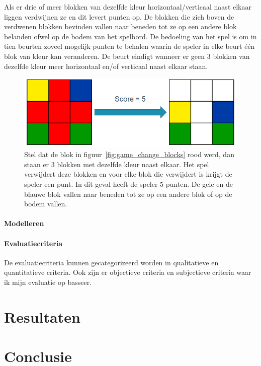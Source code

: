 \documentclass[12pt,a4paper,oneside]{book}
\begin{document}
Als er drie of meer blokken van dezelfde kleur horizontaal/verticaal naast elkaar liggen verdwijnen ze en dit levert punten op. De blokken die zich boven de verdwenen blokken bevinden vallen naar beneden tot ze op een andere blok belanden ofwel op de bodem van het spelbord. De bedoeling van het spel is om in tien beurten zoveel mogelijk punten te behalen waarin de speler in elke beurt \'{e}\'{e}n blok van kleur kan veranderen. De beurt eindigt wanneer er geen 3 blokken van dezelfde kleur meer horizontaal en/of verticaal naast elkaar staan.
\begin{figure}
  \centering
    \includegraphics[height=18truemm]{game_score}
  \caption{Stel dat de blok in figuur~\ref{fig:game_change_blocks} rood werd, dan staan er 3 blokken met dezelfde kleur naast elkaar. Het spel verwijdert deze blokken en voor elke blok die verwijdert is krijgt de speler een punt. In dit geval heeft de speler 5 punten. De gele en de blauwe blok vallen naar beneden tot ze op een andere blok of op de bodem vallen.}
  \label{fig:game_score}
\end{figure}
\subsubsection{Modelleren}
\subsubsection{Evaluatiecriteria}
De evaluatiecriteria kunnen gecategorizeerd worden in qualitatieve en quantitatieve criteria. Ook zijn er objectieve criteria en subjectieve criteria waar ik mijn evaluatie op basseer.

\chapter{Resultaten}
\chapter{Conclusie}
\end{document}
